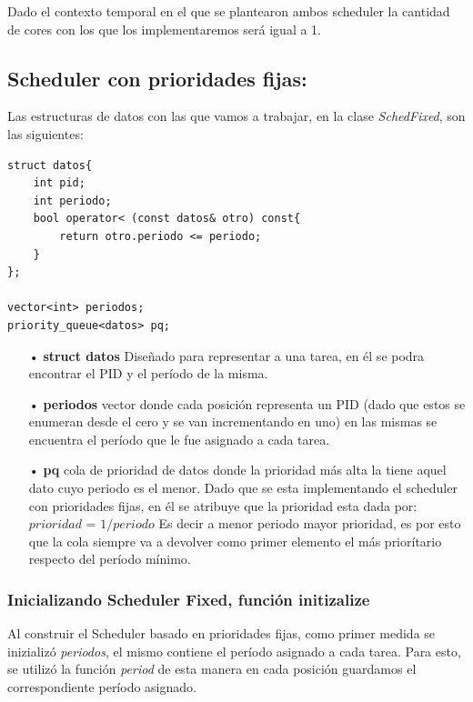 \documentclass[a4paper]{article}
\begin{document}
Dado el contexto temporal en el que se plantearon ambos scheduler la cantidad de cores con los que los implementaremos será igual a 1.

\subsection*{Scheduler con prioridades fijas:}

Las estructuras de datos con las que vamos a trabajar, en la clase \emph{SchedFixed}, son las siguientes:
	\begin{codesnippet}
	\begin{verbatim}
struct datos{
    int pid;
    int periodo;
    bool operator< (const datos& otro) const{
        return otro.periodo <= periodo;
    }
};
		
vector<int> periodos;
priority_queue<datos> pq;
	\end{verbatim}
	\end{codesnippet}
	\begin{itemize}
	\item[•]\textbf{struct datos} Diseñado para representar a una tarea, en él se podra encontrar el PID y el período de la misma.
	\item[•]\textbf{periodos} vector donde cada posición representa un PID (dado que estos se enumeran desde el cero y se van incrementando en uno) en las mismas se encuentra el período que le fue asignado a cada tarea.
	\item[•]\textbf{pq} cola de prioridad de datos donde la prioridad más alta la tiene aquel dato cuyo periodo es el menor. Dado que se esta implementando el scheduler con prioridades fijas, en él se atribuye que la prioridad esta dada por:\newline
	$prioridad$ = $1 / periodo$ \newline 
	Es decir a menor periodo mayor prioridad, es por esto que la cola siempre va a devolver como primer elemento el más priorítario respecto del per\'iodo m\'inimo.
	\end{itemize}	
	
		
\subsubsection*{Inicializando Scheduler Fixed, función initizalize}		

Al construir el Scheduler basado en prioridades fijas, como primer medida se inizializó \emph{periodos}, el mismo contiene el per\'iodo asignado a cada tarea. Para esto, se utilizó la función \emph{period} de esta manera en cada posición guardamos el correspondiente per\'iodo asignado.
\end{document}
